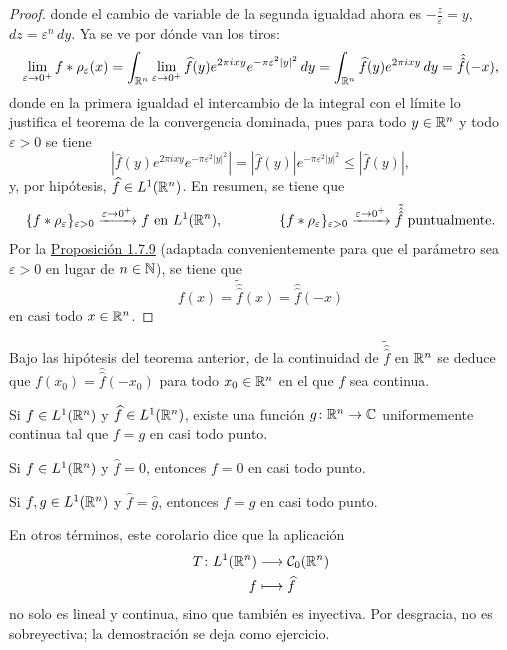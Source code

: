 \documentclass[a4paper, 11pt, oneside]{report}
\begin{document}
\begin{proof}
  donde el cambio de variable de la segunda igualdad ahora es $-\frac{z}{\varepsilon} = y$, $dz = \varepsilon^n \, dy$. Ya se ve por dónde van los tiros:
  \[\lim_{\varepsilon \to 0^+} f \ast \rho_\varepsilon(x) = \int_{\mathbb R^n} \lim_{\varepsilon \to 0^+} \widehat{f}(y)e^{2\pi i xy} e^{-\pi \varepsilon^2 |y|^2} \, dy = \int_{\mathbb R^n} \widehat{f}(y)e^{2\pi i xy}\, dy = \hat{\hat{f}}(-x),\]
  donde en la primera igualdad el intercambio de la integral con el límite lo justifica el teorema de la convergencia dominada, pues para todo $y \in \mathbb R^n$ y todo $\varepsilon > 0$ se tiene
  \[|\widehat{f}(y)e^{2\pi i xy}e^{-\pi \varepsilon^2 |y|^2}| = |\widehat{f}(y)| e^{-\pi \varepsilon^2|y|^2} \leq |\widehat{f}(y)|,\]
  y, por hipótesis, $\widehat{f} \in L^1(\mathbb R^n)$. En resumen, se tiene que 
  \[\{f \ast \rho_\varepsilon\}_{\varepsilon > 0} \xrightarrow{\varepsilon \to 0^+} f \textup{ en } L^1(\mathbb R^n), \qquad \qquad \{f \ast \rho_\varepsilon\}_{\varepsilon > 0} \xrightarrow{\varepsilon \to 0^+} \tilde{\hat{\hat{f}}} \textup{ puntualmente.}\] 
  Por la \hyperref[pro:1.8.9]{\color{c1}Proposición 1.7.9} (adaptada convenientemente para que el parámetro sea $\varepsilon > 0$ en lugar de $n \in \mathbb N$), se tiene que
  \[f(x) = \tilde{\hat{\hat{f}}}(x) = \hat{\hat{f}}(-x)\]
  en casi todo $x \in \mathbb R^n$. 
\end{proof}

Bajo las hipótesis del teorema anterior, de la continuidad de $\tilde{\hat{\hat{f}}}$ en $\mathbb R^n$ se deduce que $f(x_0) = \hat{\hat{f}}(-x_0)$ para todo $x_0 \in \mathbb R^n$ en el que $f$ sea continua.

\begin{corollary}
  Si $f \in L^1(\mathbb R^n)$ y $\widehat{f}\in L^1(\mathbb R^n)$, existe una función $g \colon \mathbb R^n \to \mathbb C$ uniformemente continua tal que $f = g$ en casi todo punto.
\end{corollary}

\begin{corollary}
  Si $f \in L^1(\mathbb R^n)$ y $\widehat{f} = 0$, entonces $f = 0$ en casi todo punto.
\end{corollary}

\begin{corollary}\label{cor:3.2.6}
  Si $f,g \in L^1(\mathbb R^n)$ y $\widehat{f} = \widehat{g}$, entonces $f = g$ en casi todo punto.
\end{corollary}

En otros términos, este corolario dice que la aplicación
\[\begin{aligned}[t]
  T \colon L^1(\mathbb R^n) &\longrightarrow \mathcal{C}_0(\mathbb R^n) \\
  f &\longmapsto \widehat{f}
\end{aligned}\]
no solo es lineal y continua, sino que también es inyectiva. Por desgracia, no es sobreyectiva; la demostración se deja como ejercicio.
\end{document}
